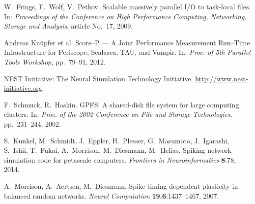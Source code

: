 \documentclass[]{YIC2015}
\begin{document}
\begin{thebibliography}{99}

W.~Frings, F.~Wolf, V.~Petkov. Scalable massively parallel I/O to task-local files.
 In: \textit{Proceedings of the Conference on High Performance Computing, Networking, Storage and Analysis}, article No.~17, 2009.

Andreas Kn\"upfer et al. Score--P --- A Joint Performance Measurement Run--Time Infrastructure for Periscope, Scalasca, TAU, and Vampir. In: \textit{Proc. of 5th Parallel Tools Workshop}, pp.~79--91, 2012.

  NEST Initiative: The Neural Simulation Technology Initiative. \url{http://www.nest-initiative.org}.

  F.~Schmuck, R.~Haskin. GPFS: A shared-disk file system for large computing clusters.
  In: \textit{Proc. of the 2002 Conference on File and Storage Technologies}, pp.~231--244, 2002.


  S.~Kunkel, M.~Schmidt, J.~Eppler, H.~Plesser, G.~Masumoto, J.~Igarashi, S.~Ishii, T.~Fukai, A.~Morrison, M.~Diesmann, M.~Helias.
  Spiking network simulation code for petascale computers.
  \textit{Frontiers in Neuroinformatics} \textbf{8}:78, 2014.

  A.~Morrison, A.~Aertsen, M.~Diesmann. Spike-timing-dependent plasticity in balanced random networks. \textit{Neural Computation} \textbf{19.6}:1437--1467, 2007.



\end{thebibliography}

\end{document}
